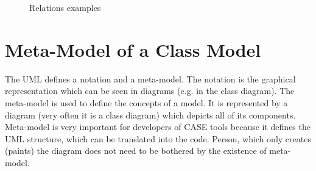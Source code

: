 \begin{figure}[!ht]
\begin{center}
\caption{Relations examples}
\label{f-relationExamples}
\end{center}
\end{figure}

\section{Meta-Model of a Class Model}
\label{classModelMetaModel}

The UML defines a notation and a meta-model. The notation is the graphical representation which can be seen in diagrams (e.g. in the class diagram). The meta-model is used to define the concepts of a model. It is represented by a diagram (very often it is a class diagram) which depicts all of its components. Meta-model is very important for developers of CASE tools because it defines the UML structure, which can be translated into the code. Person, which only creates (paints) the diagram does not need to be bothered by the existence of meta-model.

